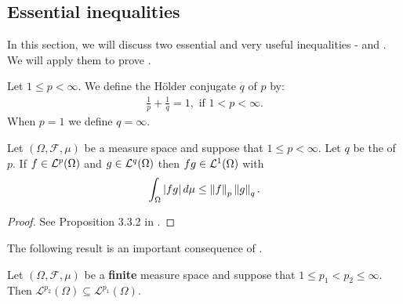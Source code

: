 \subsection{Essential inequalities}
In this section, we will discuss two essential and very useful inequalities -  and . We will apply them to prove .

\begin{definition}
\label{defn:lp:holder_conj}
Let $1 \leq p < \infty$. We define the Hölder conjugate $q$ of $p$ by:
\begin{align*}
    \frac{1}{p} + \frac{1}{q} = 1, \text{ if $1 < p < \infty$.}
\end{align*}
When $p = 1$ we define $q = \infty$.
\end{definition}

\begin{theorem}
\label{ineqn:lp:holder}
Let  $(\Omega, \mathcal{F}, \mu)$ be a measure space and suppose that $1 \leq p < \infty$.
Let $q$ be the  of $p$. If $f \in {\mathcal {L}^p}(\Omega)$ and $g \in {\mathcal {L}^q}(\Omega)$ then $fg \in {\mathcal {L}^1}(\Omega)$ with
\begin{align*}
    \int_\Omega | fg | \,d\mu \leq \left\lVert f\right\rVert_p \left\lVert g\right\rVert_q.
\end{align*}
\end{theorem}
\begin{proof}
See Proposition 3.3.2 in \cite{cohn_2013_measure}.
\end{proof}
The following result is an important consequence of .

\begin{theorem}
\label{thm:lp:inclusion}
Let $(\Omega, \mathcal{F}, \mu)$ be a \textbf{finite} measure space and suppose that $1 \leq p_1 < p_2 \leq \infty$. Then $\mathcal{L}^{p_2}(\Omega) \subseteq \mathcal{L}^{p_1}(\Omega)$.
\end{theorem}

